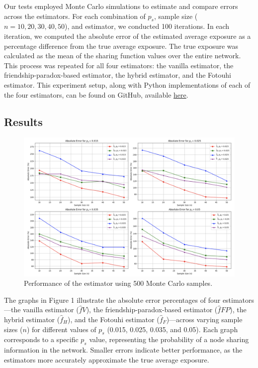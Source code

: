 \documentclass{article}
\begin{document}
Our tests employed Monte Carlo simulations to estimate and compare errors across the estimators. For each combination of $p_s$, sample size ($n = 10, 20, 30, 40, 50$), and estimator, we conducted 100 iterations. In each iteration, we computed the absolute error of the estimated average exposure as a percentage difference from the true average exposure. The true exposure was calculated as the mean of the sharing function values over the entire network. This process was repeated for all four estimators: the vanilla estimator, the friendship-paradox-based estimator, the hybrid estimator, and the Fotouhi estimator. This experiment setup, along with Python implementations of each of the four estimators, can be found on GitHub, available \href{https://github.com/asmith236/cs6850-exposure-estimation}{here}.
\endgroup
\subsection{Results}

\begin{figure}[H]
    \centering
    \includegraphics[scale=0.33]{estimator_performance_strong_monte500.png}
    \caption{Performance of the estimator using 500 Monte Carlo samples.}
    \label{fig:estimator_performance}
\end{figure}

The graphs in Figure 1 illustrate the absolute error percentages of four estimators—the vanilla estimator ($\hat{f}V$), the friendship-paradox-based estimator ($\hat{f}{FP}$), the hybrid estimator ($\hat{f}_H$), and the Fotouhi estimator ($\hat{f}_F$)—across varying sample sizes ($n$) for different values of $p_s$ (0.015, 0.025, 0.035, and 0.05). Each graph corresponds to a specific $p_s$ value, representing the probability of a node sharing information in the network. Smaller errors indicate better performance, as the estimators more accurately approximate the true average exposure.
\end{document}
